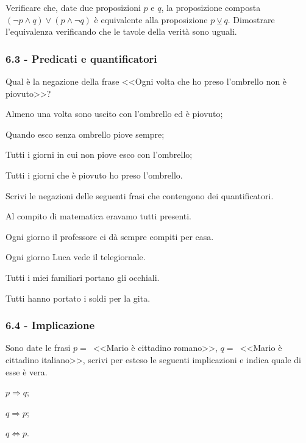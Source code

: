 \begin{esercizio}
\label{ese:6.9}
Verificare che, date due proposizioni $ p $ e $ q $, la proposizione composta  $(\neg p\wedge q)\vee (p\wedge \neg q)$  è equivalente alla proposizione  $p\veebar q$. Dimostrare l'equivalenza verificando che le tavole della verità sono uguali.
\end{esercizio}

\subsubsection*{6.3 - Predicati e quantificatori}

\begin{esercizio}
\label{ese:6.10}
Qual è la negazione della frase <<Ogni volta che ho preso l'ombrello non è piovuto>>?
\begin{enumeratea}
\item Almeno una volta sono uscito con l'ombrello ed è piovuto;
\item Quando esco senza ombrello piove sempre;
\item Tutti i giorni in cui non piove esco con l'ombrello;
\item Tutti i giorni che è piovuto ho preso l'ombrello.
\end{enumeratea}
\end{esercizio}

\begin{esercizio}
\label{ese:6.11}
Scrivi le negazioni delle seguenti frasi che contengono dei
quantificatori.
\begin{enumeratea}
\item Al compito di matematica eravamo tutti presenti.
\item Ogni giorno il professore ci dà sempre compiti per casa.
\item Ogni giorno Luca vede il telegiornale.
\item Tutti i miei familiari portano gli occhiali.
\item Tutti hanno portato i soldi per la gita.
\end{enumeratea}
\end{esercizio}

\subsubsection*{6.4 - Implicazione}

\begin{esercizio}
\label{ese:6.12}
Sono date le frasi $ p = $~<<Mario è cittadino romano>>, $ q = $~<<Mario è
cittadino italiano>>, scrivi per esteso le seguenti implicazioni e indica quale di esse è vera.
\begin{multicols}{3}
 \begin{enumeratea}
 \item $p\Rightarrow q$;
 \item $q\Rightarrow p$;
 \item $q\Leftrightarrow p$.
 \end{enumeratea}
\end{multicols}
\end{esercizio}

